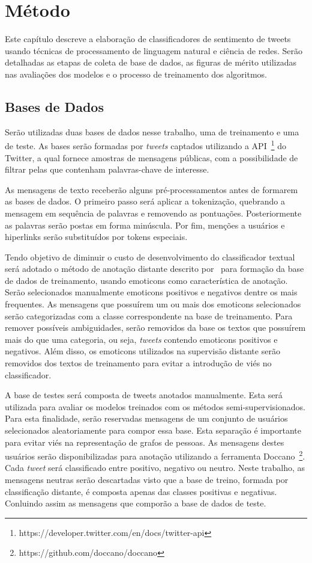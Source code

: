 \chapter{Método}
\label{chapter:method}

Este capítulo descreve a elaboração de classificadores de sentimento de tweets
usando técnicas de processamento de linguagem natural e ciência de redes.
Serão detalhadas as etapas de coleta de base de dados, as figuras de mérito
utilizadas nas avaliações dos modelos e o processo de treinamento dos
algoritmos.

\section{Bases de Dados}

Serão utilizadas duas bases de dados nesse trabalho, uma de treinamento e uma de
teste.
As bases serão formadas por \textit{tweets} captados utilizando a
API~\footnote{https://developer.twitter.com/en/docs/twitter-api} do Twitter,
a qual fornece amostras de mensagens públicas, com a possibilidade de filtrar
pelas que contenham palavras-chave de interesse.

As mensagens de texto receberão alguns pré-processamentos antes de formarem as
bases de dados.
O primeiro passo será aplicar a tokenização, quebrando a mensagem em sequência
de palavras e removendo as pontuações.
Posteriormente as palavras serão postas em forma minúscula.
Por fim, menções a usuários e hiperlinks serão substituídos por tokens especiais.

Tendo objetivo de diminuir o custo de desenvolvimento do classificador textual será
adotado o método de anotação distante descrito por~\citet{go09} para formação da
base de dados de treinamento, usando emoticons como característica de anotação.
Serão selecionados manualmente emoticons positivos e negativos dentre os mais
frequentes.
As mensagens que possuírem um ou mais dos emoticons selecionados serão
categorizadas com a classe correspondente na base de treinamento.
Para remover possíveis ambiguidades, serão removidos da base os textos que
possuírem mais do que uma categoria, ou seja, \textit{tweets} contendo emoticons
positivos e negativos.
Além disso, os emoticons utilizados na supervisão distante serão removidos dos
textos de treinamento para evitar a introdução de viés no classificador.

A base de testes será composta de tweets anotados manualmente.
Esta será utilizada para avaliar os modelos treinados com os métodos
semi-supervisionados.
Para esta finalidade, serão reservadas mensagens de um conjunto de usuários
selecionados aleatoriamente para compor essa base.
Esta separação é importante para evitar viés na representação de grafos de pessoas.
As mensagens destes usuários serão disponibilizadas para anotação utilizando a
ferramenta Doccano~\footnote{https://github.com/doccano/doccano}.
Cada \textit{tweet} será classificado entre positivo, negativo ou neutro.
Neste trabalho, as mensagens neutras serão descartadas visto que a
base de treino, formada por classificação distante, é composta apenas das
classes positivas e negativas.
Conluindo assim as mensagens que comporão a base de dados de teste.

